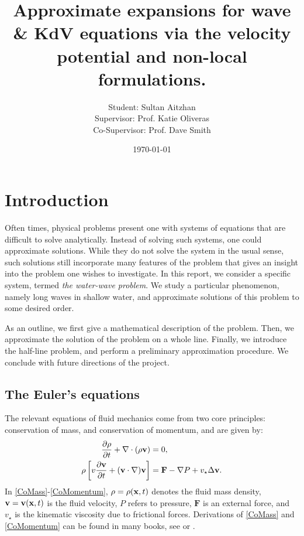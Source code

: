 \documentclass[10pt,reqno,oneside,a4paper]{article}
\author{Student: Sultan Aitzhan \\Supervisor: Prof. Katie Oliveras \\ Co-Supervisor: Prof. Dave Smith}
\title{Approximate expansions for wave \& KdV equations via the velocity potential and non-local formulations.}
\date{\today}
\begin{document}
\maketitle
\thispagestyle{fancy}
\tableofcontents

\section{Introduction}
Often times, physical problems present one with systems of equations that are difficult to solve analytically. Instead of solving such systems, one could approximate solutions. While they do not solve the system in the usual sense, such solutions still incorporate many features of the problem that gives an insight into the problem one wishes to investigate. In this report, we consider a specific system, termed \textit{the water-wave problem}. We study a particular phenomenon, namely long waves in shallow water, and approximate solutions of this problem to some desired order. 

As an outline, we first give a mathematical description of the problem. Then, we approximate the solution of the problem on a whole line. Finally, we introduce the half-line problem, and perform a preliminary approximation procedure. We conclude with future directions of the project.

\subsection{The Euler's equations}
The relevant equations of fluid mechanics come from two core principles: conservation of mass, and conservation of momentum, and are given by:
\begin{align}
\frac{\partial \rho}{\partial t} + \nabla \cdot (\rho {\bf v}) &= 0, \label{CoMass} \\
\rho\left[ v\frac{\partial {\bf v}}{\partial t} + ({\bf v} \cdot \nabla) {\bf v}\right] &= \textbf{F} - \nabla P + v_{\star} \Delta {\bf v}. \label{CoMomentum}
\end{align}
In \eqref{CoMass}-\eqref{CoMomentum}, $\rho = \rho({\bf x}, t)$ denotes the fluid mass density, ${\bf v} = {\bf v}({\bf x},t)$ is the fluid velocity, $P$ refers to pressure, $\textbf{F}$ is an external force, and $v_{\star}$ is the kinematic viscosity due to frictional forces. Derivations of \eqref{CoMass} and \eqref{CoMomentum} can be found in many books, see \cite[Chapter 3]{batchelor} or \cite[Chapter 1]{marsden}.
\end{document}
